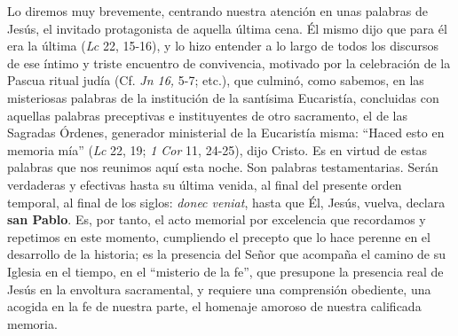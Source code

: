 			\begin{body}Lo diremos muy brevemente, centrando nuestra atención en unas palabras de Jesús, el invitado protagonista de aquella última cena. Él mismo dijo que para él era la última (\textit{Lc }22, 15-16), y lo hizo entender a lo largo de todos los discursos de ese íntimo y triste encuentro de convivencia, motivado por la celebración de la Pascua ritual judía (Cf. \textit{Jn 16, }5-7; etc.), que culminó, como sabemos, en las misteriosas palabras de la institución de la santísima Eucaristía, concluidas con aquellas palabras preceptivas e instituyentes de otro sacramento, el de las Sagradas Órdenes, generador ministerial de la Eucaristía misma: “Haced esto en memoria mía” (\textit{Lc} 22, 19; \textit{1 Cor} 11, 24-25), dijo Cristo. Es en virtud de estas palabras que nos reunimos aquí esta noche. Son palabras testamentarias. Serán verdaderas y efectivas hasta su última venida, al final del presente orden temporal, al final de los siglos: \textit{donec veniat}, hasta que Él, Jesús, vuelva, declara \textbf{san Pablo}. Es, por tanto, el acto memorial por excelencia que recordamos y repetimos en este momento, cumpliendo el precepto que lo hace perenne en el desarrollo de la historia; es la presencia del Señor que acompaña el camino de su Iglesia en el tiempo, en el “misterio de la fe”, que presupone la presencia real de Jesús en la envoltura sacramental, y requiere una comprensión obediente, una acogida en la fe de nuestra parte, el homenaje amoroso de nuestra calificada memoria. \end{body}
			
